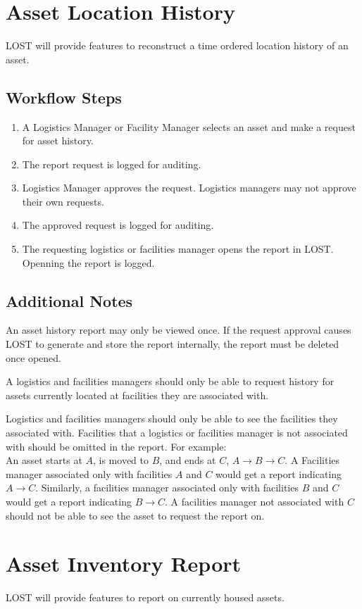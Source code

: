 \section*{Asset Location History}
LOST will provide features to reconstruct a time ordered location history of an asset.
\subsection*{Workflow Steps}
\begin{enumerate}
\item A Logistics Manager or Facility Manager selects an asset and make a request for asset history.
\item The report request is logged for auditing.
\item Logistics Manager approves the request. Logistics managers may not approve their own requests.
\item The approved request is logged for auditing.
\item The requesting logistics or facilities manager opens the report in LOST. Openning the report is logged.
\end{enumerate}
\subsection*{Additional Notes}
An asset history report may only be viewed once. If the request approval causes LOST to generate and store the report internally, the report must be deleted once opened.

A logistics and facilities managers should only be able to request history for assets currently located at facilities they are associated with.

Logistics and facilities managers should only be able to see the facilities they associated with. Facilities that a logistics or facilities manager is not associated with should be omitted in the report. For example:\\
An asset starts at $A$, is moved to $B$, and ends at $C$, $A \rightarrow B \rightarrow C$.
A Facilities manager associated only with facilities $A$ and $C$ would get a report indicating $A \rightarrow C$. Similarly, a facilities manager associated only with facilities $B$ and $C$ would get a report indicating $B \rightarrow C$. A facilities manager not associated with $C$ should not be able to see the asset to request the report on.


\section*{Asset Inventory Report}
LOST will provide features to report on currently housed assets.
